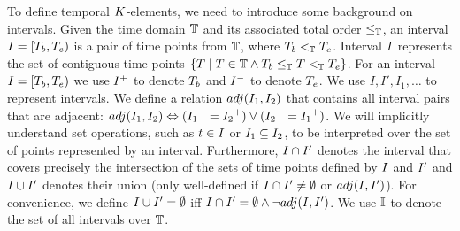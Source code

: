 




To define %
temporal $K$-elements, we need to introduce some background on
intervals. Given the time domain $\mathbb{T}$ and its associated
total order $\leq_{\mathbb{T}}$, an interval $I = [T_b, T_e)$ is a
pair of time points from $\mathbb{T}$, where $T_b <_{\mathbb{T}} T_e$.
Interval $I$ represents the set of contiguous time points
$\{ T \mid T \in \mathbb{T} \wedge T_b \leq_{\mathbb{T}} T
<_{\mathbb{T}} T_e\}$.
For an interval $I = [T_b,T_e)$ we use
${I}^+$ to denote $T_b$ and ${I}^-$ to
denote $T_e$. We use $I, I', I_1, \ldots $ to represent intervals.
We define a relation $adj(I_1,I_2)$
that contains all interval pairs that are adjacent:
$adj(I_1,I_2) \Leftrightarrow
({I_1}^- = {I_2}^+) \vee ({I_2}^-
= {I_1}^+)$.
%
We will implicitly understand set operations, such as
$t \in I$ or $I_1 \subseteq I_2$, to be
interpreted over the set of points represented by an
interval. Furthermore, $I \cap I'$ denotes the
interval that covers precisely the intersection of the sets of time
points defined by $I$ and $I'$ and
$I \cup I'$ denotes their union (only well-defined if
$I \cap I' \neq \emptyset$ or
$adj(I,I')$). For convenience, we define
$I \cup I' = \emptyset$ iff
$I \cap I' = \emptyset \land \neg
adj(I,I')$.
We use $\mathbb{I}$ to denote the set of all intervals over
$\mathbb{T}$.

